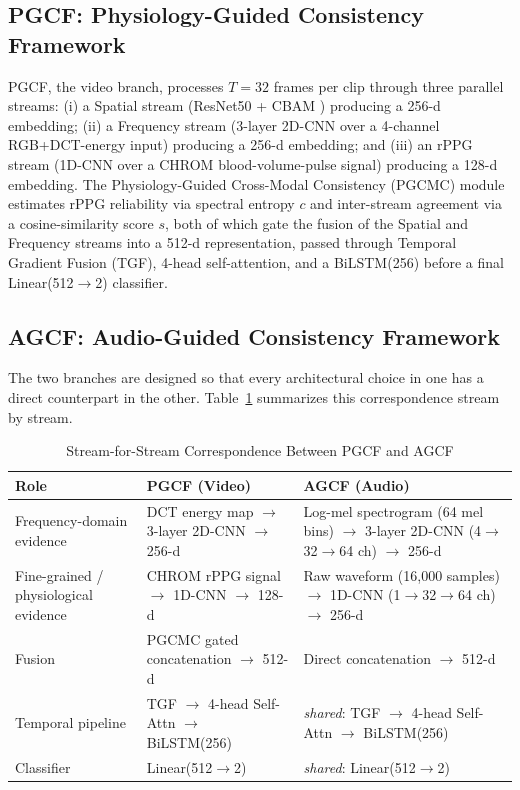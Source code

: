 \documentclass[conference]{IEEEtran}
\begin{document}
\subsection{PGCF: Physiology-Guided Consistency Framework}
PGCF, the video branch, processes $T=32$ frames per clip through three parallel streams: (i) a Spatial stream (ResNet50 + CBAM \cite{woo2018cbam}) producing a 256-d embedding; (ii) a Frequency stream (3-layer 2D-CNN over a 4-channel RGB+DCT-energy input) producing a 256-d embedding; and (iii) an rPPG stream (1D-CNN over a CHROM \cite{dehaan2013chrom} blood-volume-pulse signal) producing a 128-d embedding. The Physiology-Guided Cross-Modal Consistency (PGCMC) module estimates rPPG reliability via spectral entropy $c$ and inter-stream agreement via a cosine-similarity score $s$, both of which gate the fusion of the Spatial and Frequency streams into a 512-d representation, passed through Temporal Gradient Fusion (TGF), 4-head self-attention, and a BiLSTM(256) before a final Linear(512$\to$2) classifier.

\subsection{AGCF: Audio-Guided Consistency Framework}
The two branches are designed so that every architectural choice in one has a direct counterpart in the other. Table~\ref{tab:mirror} summarizes this correspondence stream by stream.

\begin{table}[t]
\caption{Stream-for-Stream Correspondence Between PGCF and AGCF}
\label{tab:mirror}
\centering
\small
\begin{tabular}{p{1.6cm}p{2.9cm}p{3.0cm}}
\toprule
\textbf{Role} & \textbf{PGCF (Video)} & \textbf{AGCF (Audio)} \\
\midrule
Frequency-domain evidence & DCT energy map $\to$ 3-layer 2D-CNN $\to$ 256-d & Log-mel spectrogram (64 mel bins) $\to$ 3-layer 2D-CNN (4$\to$32$\to$64 ch) $\to$ 256-d \\
Fine-grained / physiological evidence & CHROM rPPG signal $\to$ 1D-CNN $\to$ 128-d & Raw waveform (16{,}000 samples) $\to$ 1D-CNN (1$\to$32$\to$64 ch) $\to$ 256-d \\
Fusion & PGCMC gated concatenation $\to$ 512-d & Direct concatenation $\to$ 512-d \\
Temporal pipeline & TGF $\to$ 4-head Self-Attn $\to$ BiLSTM(256) & \emph{shared}: TGF $\to$ 4-head Self-Attn $\to$ BiLSTM(256) \\
Classifier & Linear(512$\to$2) & \emph{shared}: Linear(512$\to$2) \\
\bottomrule
\end{tabular}
\end{table}
\end{document}
